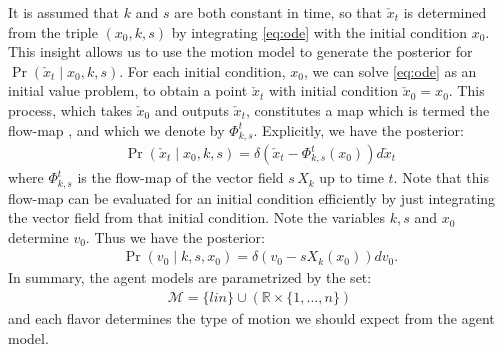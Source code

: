\documentclass[letterpaper,10pt,conference]{ieeeconf}
\begin{document}
It is assumed that $k$ and $s$ are both constant in time, so that $\check{x}_t$ is determined from the triple $(x_0,k,s)$ by integrating \eqref{eq:ode} with the initial condition $x_0$.
This insight allows us to use the motion model to generate the posterior for $\Pr( \check{x}_t \mid x_0, k, s)$.
For each initial condition, $x_0$, we can solve \eqref{eq:ode} as an initial value problem, to obtain a point $\check{x}_t$ with initial condition $\check{x}_0 = x_0$.
This process, which takes $\check{x}_0$ and outputs $\check{x}_t$, constitutes a map which is termed the flow-map \cite[Ch 4]{MTA}, and which we denote by $\Phi_{k,s}^t$.
Explicitly, we have the posterior:
\begin{align}
	\Pr( \check{x}_t \mid x_0 , k , s) = \delta( \check{x}_t - \Phi^{t}_{k,s}( x_0) )  d\check{x}_t \label{eq:x_check | ksx}
\end{align}
where $\Phi^{t}_{k,s}$ is the flow-map of the vector field $s \,X_k$ up to time $t$.
Note that this flow-map can be evaluated for an initial condition efficiently by just integrating the vector field from that initial condition.
Note the variables $k,s$ and $x_0$ determine $v_0$.
Thus we have the posterior:
\begin{align}
	\Pr( v_0 \mid k, s, x_0) = \delta( v_0 -s X_k( x_0) ) dv_0. \label{eq:v | ksx}
\end{align}
In summary, the agent models are parametrized by the set:
\begin{align}
	\mathcal{M} = \{ lin \} \cup \left( \mathbb{R} \times \{ 1 , \dots, n \} \right) \label{eq:models}
\end{align}
and each flavor determines the type of motion we should expect from the agent model.
\end{document}
